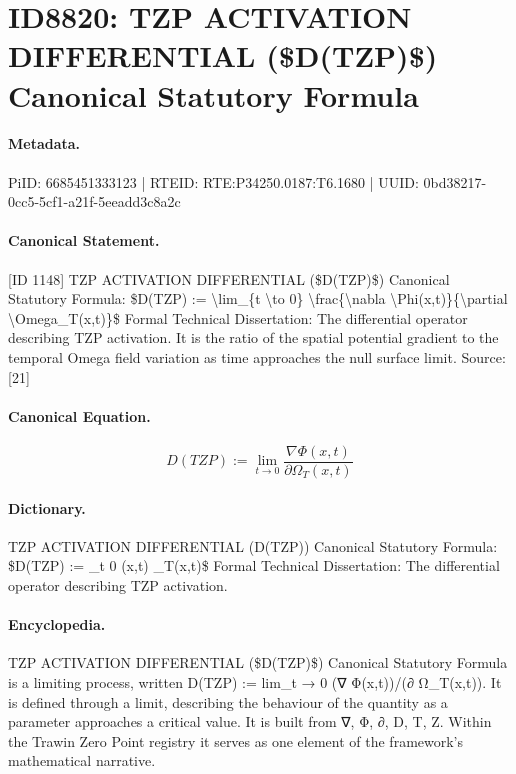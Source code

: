 \section*{ID8820: TZP ACTIVATION DIFFERENTIAL (\$D(TZP)\$) Canonical Statutory Formula}
\paragraph{Metadata.}
PiID: 6685451333123 | RTEID: RTE:P34250.0187:T6.1680 | UUID: 0bd38217-0cc5-5cf1-a21f-5eeadd3c8a2c

\paragraph{Canonical Statement.}
[ID 1148] TZP ACTIVATION DIFFERENTIAL (\$D(TZP)\$) Canonical Statutory Formula: \$D(TZP) := \textbackslash{}lim\_\{t \textbackslash{}to 0\} \textbackslash{}frac\{\textbackslash{}nabla \textbackslash{}Phi(x,t)\}\{\textbackslash{}partial \textbackslash{}Omega\_T(x,t)\}\$ Formal Technical Dissertation: The differential operator describing TZP activation. It is the ratio of the spatial potential gradient to the temporal Omega field variation as time approaches the null surface limit. Source: [21]

\paragraph{Canonical Equation.}
\[
D(TZP) := \lim_{t \to 0} \frac{\nabla \Phi(x,t)}{\partial \Omega_T(x,t)}
\]

\paragraph{Dictionary.}
TZP ACTIVATION DIFFERENTIAL (D(TZP)) Canonical Statutory Formula: \$D(TZP) := \_t 0 (x,t) \_T(x,t)\$ Formal Technical Dissertation: The differential operator describing TZP activation.

\paragraph{Encyclopedia.}
TZP ACTIVATION DIFFERENTIAL (\$D(TZP)\$) Canonical Statutory Formula is a limiting process, written D(TZP) := lim\_t → 0 (∇ Φ(x,t))/(∂ Ω\_T(x,t)). It is defined through a limit, describing the behaviour of the quantity as a parameter approaches a critical value. It is built from ∇, Φ, ∂, D, T, Z. Within the Trawin Zero Point registry it serves as one element of the framework's mathematical narrative.

